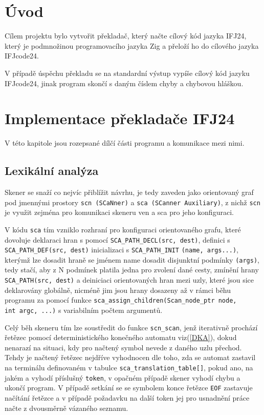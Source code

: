 \documentclass[a4paper, 11pt]{article}
\begin{document}
\section{Úvod}

Cílem projektu bylo vytvořit překladač, který načte cílový kód jazyka IFJ24, který je podmnožinou programovacího jazyka Zig a přeloží ho do cílového jazyka IFJcode24. 

V případě úspěchu překladu se na standardní výstup vypíše cílový kód jazyku IFJcode24, jinak program skončí s daným číslem chyby a chybovou hláškou.

\section{Implementace překladače IFJ24} 

V této kapitole jsou rozepsané dílčí části programu a komunikace mezi nimi.

\subsection{Lexikální analýza}

Skener se snaží co nejvíc přiblížit návrhu, je tedy zaveden jako orientovaný graf pod jmennými prostory \verb|scn (SCaNner)| a \verb|sca (SCanner Auxiliary)|, z nichž \verb|scn| je využit zejména pro komunikaci skeneru ven a sca pro jeho konfiguraci. 

V kódu \verb|sca| tím vzniklo rozhraní pro konfiguraci orientovaného grafu, které dovoluje deklaraci hran s pomocí \verb|SCA_PATH_DECL(src, dest)|, definici s \verb|SCA_PATH_DEF(src, dest)| inicializaci s \verb|SCA_PATH_INIT| \verb|(name, args...)|, kterýmž lze dosadit hraně se jménem name dosadit disjunktní podmínky \verb|(args)|, tedy stačí, aby z N podmínek platila jedna pro zvolení dané cesty, zmínění hrany 
\verb|SCA_PATH(src, dest)| a deiniciaci orientovaných hran mezi uzly, které jsou sice deklarovány globálně, nicméně jim jsou hrany dosazeny až v rámci běhu programu za pomocí funkce \verb|sca_assign_children(Scan_node_ptr node, |\\ \verb|int argc, ...)| s variabilním počtem argumentů.

Celý běh skeneru tím lze soustředit do funkce \verb|scn_scan|, jenž iterativně prochází řetězec pomocí deterministického konečného automatu viz(\ref{DKA}), dokud nenarazí na situaci, kdy pro načtený symbol nevede z daného uzlu přechod.
Tehdy je načtený řetězec nejdříve vyhodnocen dle toho, zda se automat zastavil na terminálu definovaném v tabulce \verb|sca_translation_table[]|, pokud ano, na jakém a vyhodí příslušný \verb|token|, v opačném případě skener vyhodí chybu a ukončí program.
V případě setkání se se symbolem konce řetězce \verb|EOF| zastavuje načítání řetězce a v případě požadavku na další token jej pro usnadnění práce načte z dvousměrně vázaného seznamu.
\end{document}
